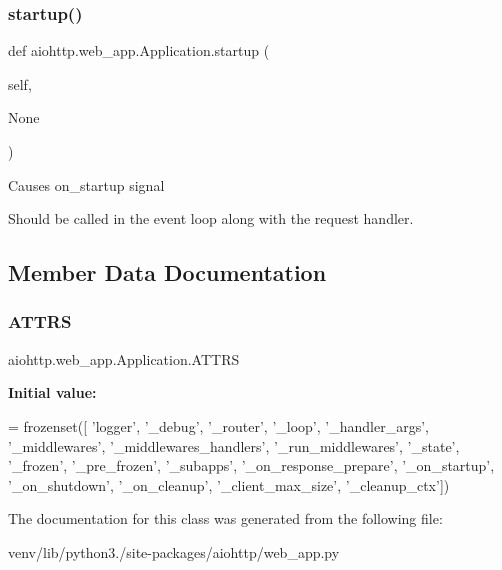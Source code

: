 \subsubsection{\texorpdfstring{startup()}{startup()}}
{\footnotesize\ttfamily def aiohttp.\+web\+\_\+app.\+Application.\+startup (\begin{DoxyParamCaption}\item[{}]{self,  }\item[{}]{None }\end{DoxyParamCaption})}

\begin{DoxyVerb}Causes on_startup signal

Should be called in the event loop along with the request handler.
\end{DoxyVerb}
 

\subsection{Member Data Documentation}
\mbox{\label{classaiohttp_1_1web__app_1_1_application_ae8ba502f22e40964b700f8eb398492c6}} 
\subsubsection{\texorpdfstring{A\+T\+T\+RS}{ATTRS}}
{\footnotesize\ttfamily aiohttp.\+web\+\_\+app.\+Application.\+A\+T\+T\+RS\hspace{0.3cm}{\ttfamily [static]}}

{\bfseries Initial value\+:}
\begin{DoxyCode}
=  frozenset([
        \textcolor{stringliteral}{'logger'}, \textcolor{stringliteral}{'\_debug'}, \textcolor{stringliteral}{'\_router'}, \textcolor{stringliteral}{'\_loop'}, \textcolor{stringliteral}{'\_handler\_args'},
        \textcolor{stringliteral}{'\_middlewares'}, \textcolor{stringliteral}{'\_middlewares\_handlers'}, \textcolor{stringliteral}{'\_run\_middlewares'},
        \textcolor{stringliteral}{'\_state'}, \textcolor{stringliteral}{'\_frozen'}, \textcolor{stringliteral}{'\_pre\_frozen'}, \textcolor{stringliteral}{'\_subapps'},
        \textcolor{stringliteral}{'\_on\_response\_prepare'}, \textcolor{stringliteral}{'\_on\_startup'}, \textcolor{stringliteral}{'\_on\_shutdown'},
        \textcolor{stringliteral}{'\_on\_cleanup'}, \textcolor{stringliteral}{'\_client\_max\_size'}, \textcolor{stringliteral}{'\_cleanup\_ctx'}])
\end{DoxyCode}


The documentation for this class was generated from the following file\+:\begin{DoxyCompactItemize}
\item 
venv/lib/python3./site-\/packages/aiohttp/web\+\_\+app.\+py\end{DoxyCompactItemize}
